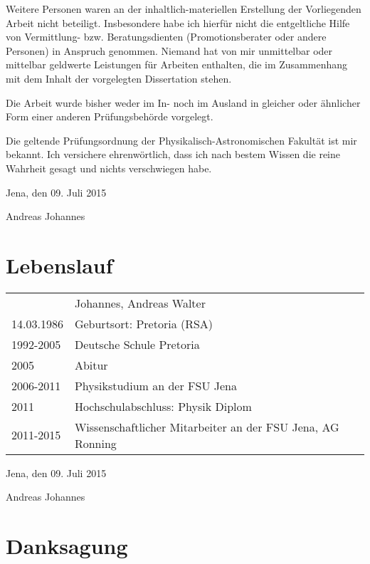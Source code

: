 \begin{appendices}
Weitere Personen waren an der inhaltlich-materiellen Erstellung der Vorliegenden Arbeit nicht beteiligt. Insbesondere habe ich hierfür nicht die entgeltliche Hilfe von Vermittlung- bzw. Beratungsdienten (Promotionsberater oder andere Personen) in Anspruch genommen. Niemand hat von mir unmittelbar oder mittelbar geldwerte Leistungen für Arbeiten enthalten, die im Zusammenhang mit dem Inhalt der vorgelegten Dissertation stehen.

Die Arbeit wurde bisher weder im In- noch im Ausland in gleicher oder ähnlicher Form einer anderen Prüfungsbehörde vorgelegt.

Die geltende Prüfungsordnung der Physikalisch-Astronomischen Fakultät ist mir bekannt.
Ich versichere ehrenwörtlich, dass ich nach bestem Wissen die reine Wahrheit gesagt und nichts verschwiegen habe.

\vspace{1.5cm}
Jena, den 09. Juli 2015 

\begin{flushright}
 Andreas Johannes
\end{flushright}

\chapter{Lebenslauf}

\begin{tabular}{ll}
& Johannes, Andreas Walter\\
14.03.1986 & Geburtsort: Pretoria (RSA)\\
1992-2005 & Deutsche Schule Pretoria\\
2005 & Abitur\\
2006-2011 & Physikstudium an der FSU Jena\\
2011 & Hochschulabschluss: Physik Diplom\\
2011-2015 & Wissenschaftlicher Mitarbeiter an der FSU Jena, AG Ronning

\end{tabular}

\vspace{1.5cm}
Jena, den 09. Juli 2015 

\begin{flushright}
 Andreas Johannes
\end{flushright}


\chapter{Danksagung}


\end{appendices}
